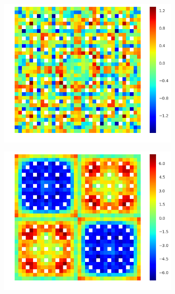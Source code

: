 \begin{figure}[h!]
\begin{subfigure}{.33\textwidth}
\end{subfigure}%
\begin{subfigure}{.33\textwidth}
  \centering
  \includegraphics[width=\linewidth]{figures/quantification/2x2/infinite-fiss-err-70}
  \caption{}
  \label{fig:chap8-2x2-inf-fiss-70}
\end{subfigure}
\begin{subfigure}{.33\textwidth}
  \centering
  \includegraphics[width=\linewidth]{figures/quantification/2x2/null-fiss-err-2}
  \caption{}
  \label{fig:chap8-2x2-null-fiss-2}
\end{subfigure}%

\end{figure}
